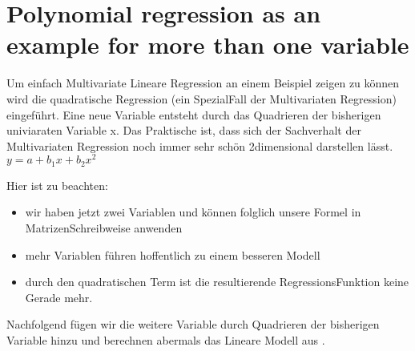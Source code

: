 \documentclass[letterpaper,10pt,english]{jupyterBook}
\begin{document}
\chapter{Polynomial regression as an example for more than one variable}
\label{\detokenize{Regression_Techniques:polynomial-regression-as-an-example-for-more-than-one-variable}}
\sphinxAtStartPar
Um einfach Multivariate Lineare Regression an einem Beispiel zeigen zu können wird die quadratische Regression (ein Spezial\sphinxhyphen{}Fall der Multivariaten Regression) eingeführt. Eine neue Variable entsteht durch das Quadrieren der bisherigen univiaraten Variable x. Das Praktische ist, dass sich der Sachverhalt der Multivariaten Regression noch immer sehr schön 2\sphinxhyphen{}dimensional darstellen lässt.
\(y = a + b_1 x + b_2 x^2\)

\sphinxAtStartPar
Hier ist zu beachten:
\begin{itemize}
\item {} 
\sphinxAtStartPar
wir haben jetzt zwei Variablen und können folglich unsere Formel in Matrizen\sphinxhyphen{}Schreibweise anwenden

\item {} 
\sphinxAtStartPar
mehr Variablen führen hoffentlich zu einem besseren Modell

\item {} 
\sphinxAtStartPar
durch den quadratischen Term ist die resultierende Regressions\sphinxhyphen{}Funktion keine Gerade mehr.

\end{itemize}

\sphinxAtStartPar
Nachfolgend fügen wir die weitere Variable durch Quadrieren der bisherigen Variable hinzu und berechnen abermals das Lineare Modell aus .
\end{document}
